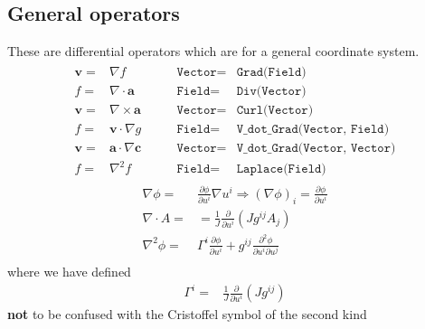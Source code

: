 \documentclass[12pt]{article}
\newcommand{\code}[1]{\texttt{#1}}
\newcommand{\deriv}[2]{\ensuremath{\frac{\partial #1}{\partial #2}}}
\begin{document}
\subsection{General operators}
%
These are differential operators which are for a general coordinate system.
%
\begin{align}
%
\begin{array}{rclrcl}
\mathbf{v} =& \nabla f &\qquad \code{Vector} =& \code{Grad(Field)} \\
f =& \nabla\cdot\mathbf{a} &\qquad \code{Field} =& \code{Div(Vector)} \\
\mathbf{v} =& \nabla\times\mathbf{a} &\qquad \code{Vector} =& 
\code{Curl(Vector)} \\
f =& \mathbf{v}\cdot\nabla g &\qquad \code{Field} =& \code{V\_dot\_Grad(Vector, 
Field)} \\
\mathbf{v} =& \mathbf{a}\cdot\nabla\mathbf{c} &\qquad \code{Vector} =&
\code{V\_dot\_Grad(Vector, Vector)} \\
f =& \nabla^2 f &\qquad \code{Field} =& \code{Laplace(Field)}
\end{array}
%
\end{align}
%
\begin{align*}
\nabla\phi =& \deriv{\phi}{u^i}\nabla u^i \Rightarrow \left(\nabla\phi\right)_i
    = \deriv{\phi}{u^i} \\ \nabla\cdot A =& =
    \frac{1}{J}\deriv{}{u^i}\left(Jg^{ij}A_j\right) \\ \nabla^2\phi =&
    \Gamma^i\deriv{\phi}{u^i} + g^{ij}\frac{\partial^2\phi}{\partial
    u^i\partial u^j} \\
\end{align*}
%
where we have defined
%
\begin{align*}
\Gamma^i =& \frac{1}{J}\deriv{}{u^i}\left(Jg^{ij}\right)
\end{align*}
%
\textbf{not} to be confused with the Cristoffel symbol of the second kind
%
\end{document}
